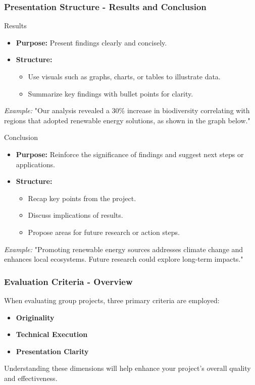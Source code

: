 \documentclass[aspectratio=169]{beamer}
\begin{document}
\begin{frame}[fragile]
    \frametitle{Presentation Structure - Results and Conclusion}
    \begin{block}{Results}
        \begin{itemize}
            \item \textbf{Purpose:} Present findings clearly and concisely.
            \item \textbf{Structure:}
            \begin{itemize}
                \item Use visuals such as graphs, charts, or tables to illustrate data.
                \item Summarize key findings with bullet points for clarity.
            \end{itemize}
        \end{itemize}
    \end{block}
    
    \textit{Example:} "Our analysis revealed a 30\% increase in biodiversity correlating with regions that adopted renewable energy solutions, as shown in the graph below."
    
    \begin{block}{Conclusion}
        \begin{itemize}
            \item \textbf{Purpose:} Reinforce the significance of findings and suggest next steps or applications.
            \item \textbf{Structure:}
            \begin{itemize}
                \item Recap key points from the project.
                \item Discuss implications of results.
                \item Propose areas for future research or action steps.
            \end{itemize}
        \end{itemize}
    \end{block}
    
    \textit{Example:} "Promoting renewable energy sources addresses climate change and enhances local ecosystems. Future research could explore long-term impacts."
\end{frame}

\begin{frame}[fragile]
    \frametitle{Evaluation Criteria - Overview}
    When evaluating group projects, three primary criteria are employed:
    \begin{itemize}
        \item \textbf{Originality}
        \item \textbf{Technical Execution}
        \item \textbf{Presentation Clarity}
    \end{itemize}
    Understanding these dimensions will help enhance your project's overall quality and effectiveness.
\end{frame}
\end{document}
